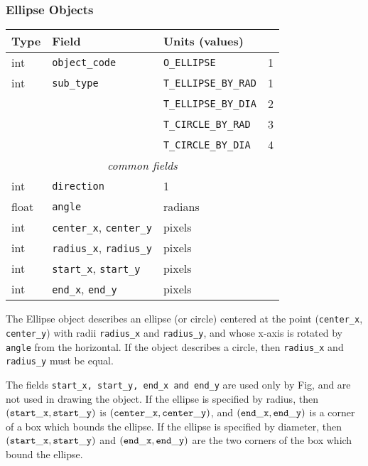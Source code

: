 \subsubsection{Ellipse Objects}
%
\begin{center}
\begin{tabular} {|l|l|ll|}
\hline

Type	& Field			& Units (values)	&	\\ \hline
\hline
%
int	& {\tt object\_code}	& {\tt O\_ELLIPSE}	&     1	\\ \hline
%
int	& {\tt sub\_type}	& {\tt T\_ELLIPSE\_BY\_RAD} & 1	\\
	&			& {\tt T\_ELLIPSE\_BY\_DIA} & 2	\\
	&			& {\tt T\_CIRCLE\_BY\_RAD} &  3	\\
	&			& {\tt T\_CIRCLE\_BY\_DIA} &  4	\\ \hline
%
\multicolumn{4}{c}{\it common fields}				\\ \hline
%
int	& {\tt direction}	& 1			&	\\ \hline
%
float	& {\tt angle}		& radians		&	\\ \hline
%
int	& {\tt center\_x},
	  {\tt center\_y}	& pixels		&	\\ \hline
%
int	& {\tt radius\_x},
	  {\tt radius\_y}	& pixels		&	\\ \hline
%
int	& {\tt start\_x},
	  {\tt start\_y}	& pixels		&	\\ \hline
%
int	& {\tt end\_x},
	  {\tt end\_y}		& pixels		&	\\ \hline
\end{tabular}
\end{center}
%
The Ellipse object describes an ellipse (or circle) centered at the point
	\linebreak ({\tt center\_x}, {\tt center\_y})
	with radii {\tt radius\_x} and {\tt radius\_y}, and whose x-axis
	is rotated by {\tt angle} from the horizontal.
If the object describes a circle, then {\tt radius\_x} and {\tt radius\_y}
	must be equal.

The fields {\tt start\_x, start\_y, end\_x and end\_y} are used only by
	Fig, and are not used in drawing the object.
If the ellipse is specified by radius, then $({\tt start\_x}, {\tt start\_y})$
	is $({\tt center\_x}, {\tt center\_y})$,
	and $({\tt end\_x}, {\tt end\_y})$ is a corner of a box which
	bounds the ellipse.
If the ellipse is specified by diameter, then $({\tt start\_x}, {\tt start\_y})$
	and $({\tt end\_x}, {\tt end\_y})$ are the two corners of the box
	which bound the ellipse.

